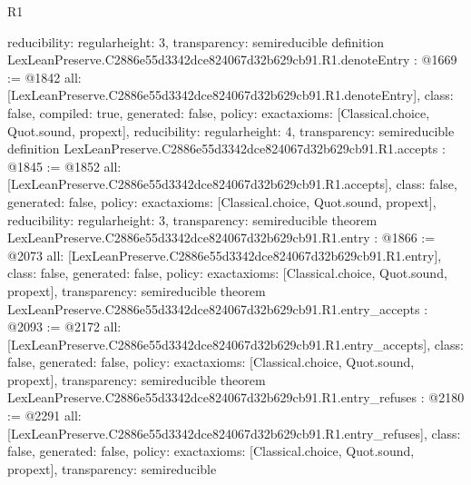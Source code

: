 \begin{lexlean}{R1}
\begin{coremodule}
{  reducibility: regular{height: 3},
  transparency: semireducible
}
definition LexLeanPreserve.C2886e55d3342dce824067d32b629cb91.R1.denoteEntry : @1669 := @1842 {
  all: [LexLeanPreserve.C2886e55d3342dce824067d32b629cb91.R1.denoteEntry],
  class: false,
  compiled: true,
  generated: false,
  policy: exact{axioms: [Classical.choice, Quot.sound, propext]},
  reducibility: regular{height: 4},
  transparency: semireducible
}
definition LexLeanPreserve.C2886e55d3342dce824067d32b629cb91.R1.accepts : @1845 := @1852 {
  all: [LexLeanPreserve.C2886e55d3342dce824067d32b629cb91.R1.accepts],
  class: false,
  generated: false,
  policy: exact{axioms: [Classical.choice, Quot.sound, propext]},
  reducibility: regular{height: 3},
  transparency: semireducible
}
theorem LexLeanPreserve.C2886e55d3342dce824067d32b629cb91.R1.entry : @1866 := @2073 {
  all: [LexLeanPreserve.C2886e55d3342dce824067d32b629cb91.R1.entry],
  class: false,
  generated: false,
  policy: exact{axioms: [Classical.choice, Quot.sound, propext]},
  transparency: semireducible
}
theorem LexLeanPreserve.C2886e55d3342dce824067d32b629cb91.R1.entry_accepts : @2093 := @2172 {
  all: [LexLeanPreserve.C2886e55d3342dce824067d32b629cb91.R1.entry_accepts],
  class: false,
  generated: false,
  policy: exact{axioms: [Classical.choice, Quot.sound, propext]},
  transparency: semireducible
}
theorem LexLeanPreserve.C2886e55d3342dce824067d32b629cb91.R1.entry_refuses : @2180 := @2291 {
  all: [LexLeanPreserve.C2886e55d3342dce824067d32b629cb91.R1.entry_refuses],
  class: false,
  generated: false,
  policy: exact{axioms: [Classical.choice, Quot.sound, propext]},
  transparency: semireducible
}


\end{coremodule}
\end{lexlean}
